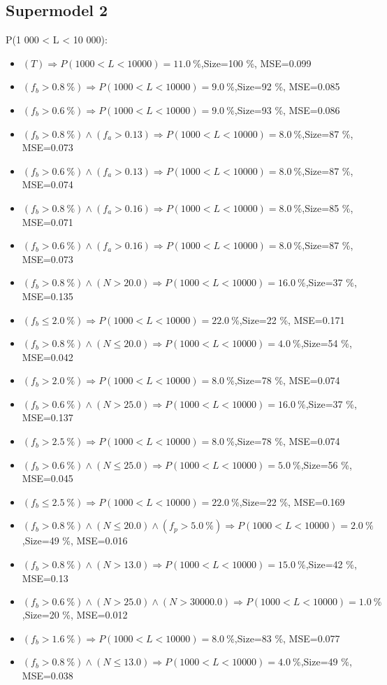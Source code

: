 \documentclass[numbered]{CSL}
\begin{document}
\subsection{Supermodel 2}
P(1 000 < L < 10 000):
\begin{itemize}
\item $(T) \Rightarrow P(1 000 < L < 10 000) = 11.0~\%$,\hfill Size=100 \%, MSE=0.099
\item $(f_b > 0.8~\%) \Rightarrow P(1 000 < L < 10 000) = 9.0~\%$,\hfill Size=92 \%, MSE=0.085
\item $(f_b > 0.6~\%) \Rightarrow P(1 000 < L < 10 000) = 9.0~\%$,\hfill Size=93 \%, MSE=0.086
\item $(f_b > 0.8~\%) \land (f_a > 0.13) \Rightarrow P(1 000 < L < 10 000) = 8.0~\%$,\hfill Size=87 \%, MSE=0.073
\item $(f_b > 0.6~\%) \land (f_a > 0.13) \Rightarrow P(1 000 < L < 10 000) = 8.0~\%$,\hfill Size=87 \%, MSE=0.074
\item $(f_b > 0.8~\%) \land (f_a > 0.16) \Rightarrow P(1 000 < L < 10 000) = 8.0~\%$,\hfill Size=85 \%, MSE=0.071
\item $(f_b > 0.6~\%) \land (f_a > 0.16) \Rightarrow P(1 000 < L < 10 000) = 8.0~\%$,\hfill Size=87 \%, MSE=0.073
\item $(f_b > 0.8~\%) \land (N > 20.0) \Rightarrow P(1 000 < L < 10 000) = 16.0~\%$,\hfill Size=37 \%, MSE=0.135
\item $(f_b \leq 2.0~\%) \Rightarrow P(1 000 < L < 10 000) = 22.0~\%$,\hfill Size=22 \%, MSE=0.171
\item $(f_b > 0.8~\%) \land (N \leq 20.0) \Rightarrow P(1 000 < L < 10 000) = 4.0~\%$,\hfill Size=54 \%, MSE=0.042
\item $(f_b > 2.0~\%) \Rightarrow P(1 000 < L < 10 000) = 8.0~\%$,\hfill Size=78 \%, MSE=0.074
\item $(f_b > 0.6~\%) \land (N > 25.0) \Rightarrow P(1 000 < L < 10 000) = 16.0~\%$,\hfill Size=37 \%, MSE=0.137
\item $(f_b > 2.5~\%) \Rightarrow P(1 000 < L < 10 000) = 8.0~\%$,\hfill Size=78 \%, MSE=0.074
\item $(f_b > 0.6~\%) \land (N \leq 25.0) \Rightarrow P(1 000 < L < 10 000) = 5.0~\%$,\hfill Size=56 \%, MSE=0.045
\item $(f_b \leq 2.5~\%) \Rightarrow P(1 000 < L < 10 000) = 22.0~\%$,\hfill Size=22 \%, MSE=0.169
\item $(f_b > 0.8~\%) \land (N \leq 20.0) \land (f_p > 5.0~\%) \Rightarrow P(1 000 < L < 10 000) = 2.0~\%$,\hfill Size=49 \%, MSE=0.016
\item $(f_b > 0.8~\%) \land (N > 13.0) \Rightarrow P(1 000 < L < 10 000) = 15.0~\%$,\hfill Size=42 \%, MSE=0.13
\item $(f_b > 0.6~\%) \land (N > 25.0) \land (N > 30000.0) \Rightarrow P(1 000 < L < 10 000) = 1.0~\%$,\hfill Size=20 \%, MSE=0.012
\item $(f_b > 1.6~\%) \Rightarrow P(1 000 < L < 10 000) = 8.0~\%$,\hfill Size=83 \%, MSE=0.077
\item $(f_b > 0.8~\%) \land (N \leq 13.0) \Rightarrow P(1 000 < L < 10 000) = 4.0~\%$,\hfill Size=49 \%, MSE=0.038
\end{itemize}
\end{document}

